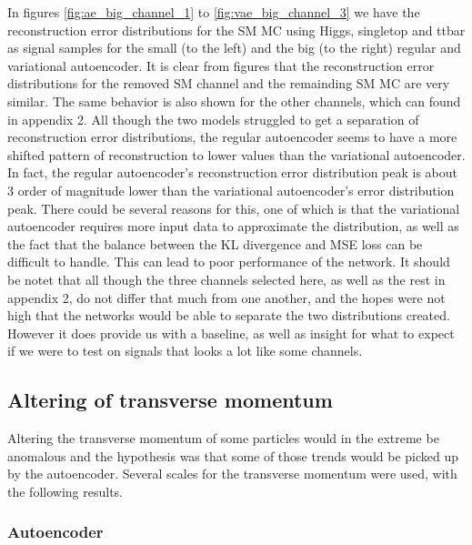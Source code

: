 In figures \ref{fig:ae_big_channel_1} to \ref{fig:vae_big_channel_3} we have the reconstruction error distributions for the SM MC using 
Higgs, singletop and ttbar as signal samples for the small (to the left) and the big (to the right) regular and variational autoencoder. 
It is clear from figures that the reconstruction error distributions for the removed SM channel and the remainding SM MC are very similar. 
The same behavior is also shown for the other channels, which can found in appendix 2. All though the two models struggled to get a 
separation of reconstruction error distributions, the regular autoencoder seems to have a more shifted pattern of reconstruction to lower 
values than the variational autoencoder. In fact, the regular autoencoder's reconstruction error distribution peak is about 3 order of 
magnitude lower than the variational autoencoder's error distribution peak. There could be several reasons for this, one of which is that 
the variational autoencoder requires more input data to approximate the distribution, as well as the fact that the balance between the KL divergence and MSE loss 
can be difficult to handle\cite{kl_mse_balance}. This can lead to poor performance of the network. It should be notet that all though the 
three channels selected here, as well as the rest in appendix 2, do not differ that much from one another, and the hopes were not high that 
the networks would be able to separate the two distributions created. However it does provide us with a baseline, as well as insight for what 
to expect if we were to test on signals that looks a lot like some channels. 


\newpage


\subsection*{Altering of transverse momentum}
Altering the transverse momentum of some particles would in the extreme be anomalous and the hypothesis was that some of those trends would be
picked up by the autoencoder. Several scales for the transverse momentum were used, with the following results.

\subsubsection*{Autoencoder}

